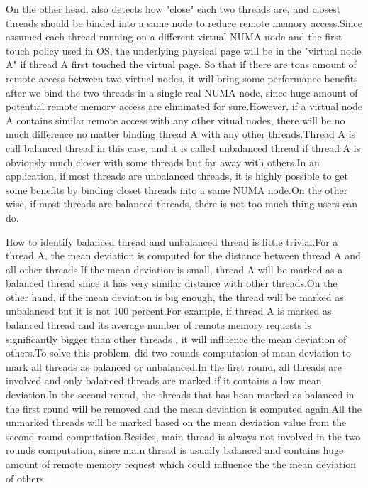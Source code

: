 On the other head, \NP{} also detects how "close" each two threads are, and closest threads should be binded into a same node to reduce remote memory access.Since \NP{} assumed each thread running on a different virtual NUMA node and the first touch policy used in OS, the underlying physical page will be in the "virtual node A" if thread A first touched the virtual page. So that if there are tons amount of remote access between two virtual nodes, it will bring some performance benefits after we bind the two threads in a single real NUMA node, since huge amount of potential remote memory access are eliminated for sure.However, if a virtual node A contains similar remote access with any other vitual nodes, there will be no much difference no matter binding thread A with any other threads.Thread A is call balanced thread in this case, and it is called unbalanced thread if thread A is obviously much closer with some threads but far away with others.In an application, if most threads are unbalanced threads, it is highly possible to get some benefits by binding closet threads into a same NUMA node.On the other wise, if most threads are balanced threads, there is not too much thing users can do.

How to identify balanced thread and unbalanced thread is little trivial.For a thread A, the mean deviation is computed for the distance between thread A and all other threads.If the mean deviation is small, thread A will be marked as a balanced thread since it has very similar distance with other threads.On the other hand, if the mean deviation is big enough, the thread will be marked as unbalanced but it is not 100 percent.For example, if thread A is marked as balanced thread and its average number of remote memory requests is significantly bigger than other threads , it will influence the mean deviation of others.To solve this problem, \NP{} did two rounds computation of mean deviation to mark all threads as balanced or unbalanced.In the first round, all threads are involved and only balanced threads are marked if it contains a low mean deviation.In the second round, the threads that has bean marked as balanced in the first round will be removed and the mean deviation is computed again.All the unmarked threads will be marked based on the mean deviation value from the second round computation.Besides, main thread is always not involved in the two rounds computation, since main thread is usually balanced and contains huge amount of remote memory request which could influence the the mean deviation of others.

